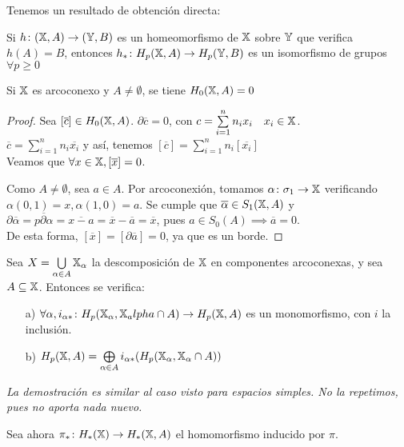 Tenemos un resultado de obtención directa:

\begin{corollary}
  Si $h \colon ({\mathbb X}, A) \to ({\mathbb Y}, B)$ es un homeomorfismo de ${\mathbb X}$ sobre ${\mathbb Y}$ que verifica $h(A) = B$, entonces
  $h_* \colon H_p({\mathbb X}, A) \to H_p({\mathbb Y}, B)$ es un isomorfismo de grupos $\forall p \geq 0$
\end{corollary}

\begin{proposition}
  Si ${\mathbb X}$ es arcoconexo y $A \neq \emptyset$, se tiene $H_0({\mathbb X}, A) = 0$
\end{proposition}

\begin{proof}
  Sea $[\overline{c}] \in H_0({\mathbb X}, A)$. $\partial\overline{c} = 0$, con $c = \sum\limits_{i = 1}^n n_i x_i \quad x_i \in {\mathbb X}$. \\
  $\overline{c} = \sum\limits_{i = 1}^n n_i \overline{x_i}$ y así, tenemos $[\overline{c}] = \sum\limits_{i = 1}^n n_i [\overline{x_i}]$ \\
  Veamos que $\forall x \in {\mathbb X}, [\overline{x}] = 0$.

  Como $A \neq \emptyset$, sea $a \in A$. Por arcoconexión, tomamos $\alpha \colon \sigma_1 \to {\mathbb X}$ verificando $\alpha(0, 1) = x, \alpha(1, 0) = a$.
  Se cumple que $\overline{\alpha} \in S_1({\mathbb X}, A)$ y $\partial\overline{\alpha} = \overline{p\partial\alpha} = \overline{x - a} = \overline{x} - \overline{a}
  = \overline{x}$, pues $a \in S_0(A) \implies \overline{a} = 0$. \\
  De esta forma, $[\overline{x}] = [\partial\overline{a}] = 0$, ya que es un borde.
\end{proof}

\begin{proposition}
  Sea $X = \bigcup\limits_{\alpha \in A} {\mathbb X}_\alpha$ la descomposición de ${\mathbb X}$ en componentes arcoconexas, y sea $A \subseteq {\mathbb X}$. Entonces se verifica:
  \begin{itemize}
    \item[a)] $\forall \alpha, i_{\alpha *} \colon H_p({\mathbb X}_\alpha, {\mathbb X}_alpha \cap A) \to H_p({\mathbb X}, A)$ es un monomorfismo, con $i$ la inclusión.
    \item[b)] $H_p({\mathbb X}, A) = \bigoplus\limits_{\alpha \in A}  i_{\alpha *}(H_p({\mathbb X}_\alpha, {\mathbb X}_\alpha \cap A))$
  \end{itemize}
\end{proposition}

\textit{La demostración es similar al caso visto para espacios simples. No la repetimos, pues no aporta nada nuevo.}

Sea ahora $\pi_* \colon H_*({\mathbb X}) \to H_*({\mathbb X}, A)$ el homomorfismo inducido por $\pi$.
